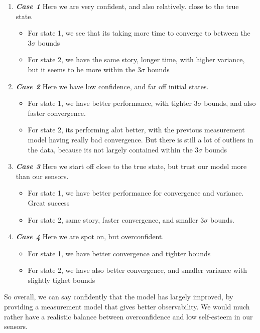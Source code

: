 \documentclass[12pt,A4, onecolumn]{exam}
\begin{document}
\begin{questions}
\begin{solution}
  \begin{enumerate}
    \item \textbf{\textit{Case 1}}
    Here we are very confident,  and also relatively. close to the true state.
    \begin{itemize}
      \item For state 1, we see that its taking more time to converge to between the $ 3\sigma $ bounds
      \item For state 2, we have the same story, longer time, with higher variance, but it seems to be more within the $ 3\sigma $ bounds  
    \end{itemize}
    \item \textbf{\textit{Case 2}}
    Here we have low confidence, and far off initial states.
    \begin{itemize}
      \item For state 1, we have better performance, with tighter $ 3\sigma $ bounds, and also faster convergence. 
      \item For state 2, its performing alot better, with the previous measurement model having really bad convergence. But there is still a lot of outliers in the data, because its not largely contained within the $ 3\sigma $ bounds 
    \end{itemize}
    \item \textbf{\textit{Case 3}}
    Here we start off close to the true state, but trust our model more than our sensors.
    \begin{itemize}
      \item For state 1, we have better performance for convergence and variance. Great success
      \item For state 2, same story, faster convergence, and smaller $ 3\sigma $ bounds. 
    \end{itemize}
    \item \textbf{\textit{Case 4}}
    Here we are spot on, but overconfident.
    \begin{itemize}
      \item For state 1, we have better convergence and tighter bounds
      \item For state 2, we have also better convergence, and smaller variance with slightly tighet bounds
    \end{itemize}
  \end{enumerate}

  So overall, we can say confidently that the model has largely improved, by providing a measurement model that gives better observability. We would much rather have a realistic balance between overconfidence and low self-esteem in our sensors.


\end{solution}
\end{questions}
\end{document}
